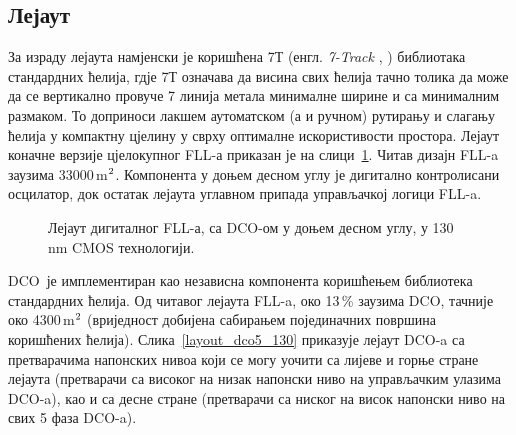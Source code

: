 \documentclass[master]{finthesis}
\makeatletter
\newcommand*{\engl}[2][\@empty]{%
    \edef\theacronym{#1}%
    (енгл. \foreignlanguage{english}{\emph{#2}%
    \ifx\theacronym\@empty \else , #1\fi})%
}
\def \FLL  {FLL} %
\def \DCO  {DCO} %
\makeatother
\begin{document}
\subsection{Лејаут}
За израду лејаута намјенски је коришћена 7Т \engl{7-Track} библиотака стандардних ћелија, гдје 7Т означава да висина свих ћелија тачно толика да може да се вертикално провуче 7 линија метала минималне ширине и са минималним размаком. То доприноси лакшем аутоматском (а и ручном) рутирању и слагању ћелија у компактну цјелину у сврху оптималне искористивости простора. Лејаут коначне верзије цјелокупног \FLL-а приказан је на слици~\ref{layout_FLL}. Читав дизајн \FLL-a заузима 33000\,\text\textmu m$^\text2$. Компонента у доњем десном углу је дигитално контролисани осцилатор, док остатак лејаута углавном припада управљачкој логици \FLL-a. \par
\begin{figure}[!ht]
	 \centering
	\caption{Лејаут дигиталног \FLL-а, са \DCO-ом у доњем десном углу, у 130\,nm CMOS технологији.}
	\label{layout_FLL}
\end{figure}
\DCO\ је имплементиран као независна компонента коришћењем библиотека стандардних ћелија. Од читавог лејаута \FLL-a, око 13\,\% заузима \DCO, тачније око 4300\,\text\textmu m$^\text2$ (вриједност добијена сабирањем појединачних површина коришћених ћелија). Слика~\ref{layout_dco5_130} приказује лејаут \DCO-a са претварачима напонских нивоа који се могу уочити са лијеве и горње стране лејаута (претварачи са високог на низак напонски ниво на управљачким улазима \DCO-a), као и са десне стране (претварачи са ниског на висок напонски ниво на свих 5 фаза \DCO-a). \par 
\end{document}
